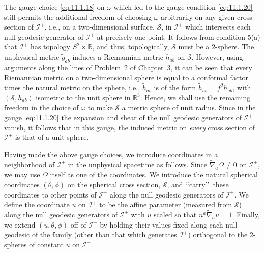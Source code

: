 The gauge choice \eqref{eq:11.1.18} on \(\omega\) which led to the gauge condition
\eqref{eq:11.1.20} still permits the additional freedom of choosing \(\omega\)
arbitrarily on any given cross section of \(\mathcal I^+\), i.e., on a two-dimensional
surface, \(\mathcal S\), in \(\mathcal I^+\) which intersects each null geodesic
generator of \(\mathcal I^+\) at precisely one point. It follows from condition 5(a)
that \(\mathcal I^+\) has topology \(S^2\times\mathbb R\), and thus, topologically,
\(\mathcal S\) must be a 2-sphere. The unphysical metric \(\tilde g_{ab}\) induces a
Riemannian metric \(\tilde h_{ab}\) on \(\mathcal S\). However, using arguments along
the lines of Problem~2 of Chapter~3, it can be seen that every Riemannian metric on
a two-dimensional sphere is equal to a conformal factor times the natural metric on
the sphere, i.e., \(\tilde h_{ab}\) is of the form \(\tilde h_{ab}=f^2h_{ab}\), with
\((\mathcal S,h_{ab})\) isometric to the unit sphere in \(\mathbb R^3\). Hence, we
shall use the remaining freedom in the choice of \(\omega\) to make \(\mathcal S\) a
metric sphere of unit radius. Since in the gauge \eqref{eq:11.1.20} the expansion and
shear of the null geodesic generators of \(\mathcal I^+\) vanish, it follows that in
this gauge, the induced metric on \emph{every} cross section of \(\mathcal I^+\) is
that of a unit sphere.

Having made the above gauge choices, we introduce coordinates in a neighborhood of
\(\mathcal I^+\) in the unphysical spacetime as follows. Since
\(\tilde\nabla_a\Omega\ne0\) on \(\mathcal I^+\), we may use \(\Omega\) itself as one
of the coordinates. We introduce the natural spherical coordinates \((\theta,\phi)\)
on the spherical cross section, \(\mathcal S\), and \lq\lq carry\rq\rq\ these coordinates to
other points of \(\mathcal I^+\) along the null geodesic generators of \(\mathcal I^+\).
We define the coordinate \(u\) on \(\mathcal I^+\) to be the affine parameter
(measured from \(\mathcal S\)) along the null geodesic generators of \(\mathcal I^+\)
with \(u\) scaled so that \(n^a\tilde\nabla_au=1\). Finally, we extend
\((u,\theta,\phi)\) off of \(\mathcal I^+\) by holding their values fixed along each
null geodesic of the family (other than that which generates \(\mathcal I^+\))
orthogonal to the 2-spheres of constant \(u\) on \(\mathcal I^+\).

